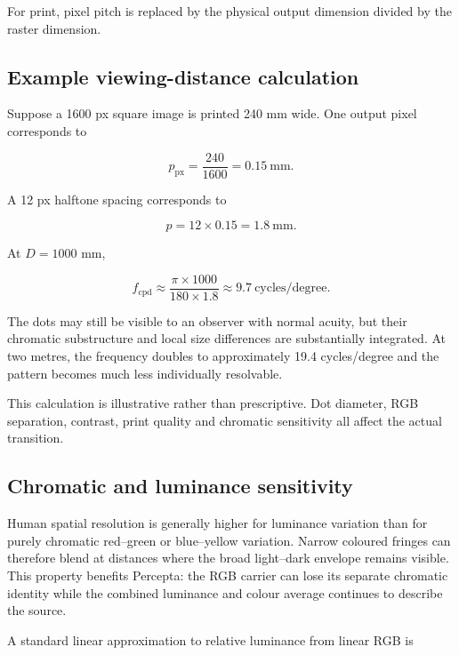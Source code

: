 For print, pixel pitch is replaced by the physical output dimension divided by the raster dimension.

\subsection{Example viewing-distance calculation}

Suppose a 1600 px square image is printed 240 mm wide. One output pixel corresponds to

\begin{equation}
p_{\mathrm{px}}=\frac{240}{1600}=0.15\ \text{mm}.
\end{equation}

A 12 px halftone spacing corresponds to

\begin{equation}
p=12\times0.15=1.8\ \text{mm}.
\end{equation}

At $D=1000$ mm,

\begin{equation}
f_{\mathrm{cpd}}
\approx
\frac{\pi\times1000}{180\times1.8}
\approx9.7\ \text{cycles/degree}.
\end{equation}

The dots may still be visible to an observer with normal acuity, but their chromatic substructure and local size differences are substantially integrated. At two metres, the frequency doubles to approximately 19.4 cycles/degree and the pattern becomes much less individually resolvable.

This calculation is illustrative rather than prescriptive. Dot diameter, RGB separation, contrast, print quality and chromatic sensitivity all affect the actual transition.

\subsection{Chromatic and luminance sensitivity}

Human spatial resolution is generally higher for luminance variation than for purely chromatic red--green or blue--yellow variation. Narrow coloured fringes can therefore blend at distances where the broad light--dark envelope remains visible. This property benefits Percepta: the RGB carrier can lose its separate chromatic identity while the combined luminance and colour average continues to describe the source.

A standard linear approximation to relative luminance from linear RGB is

